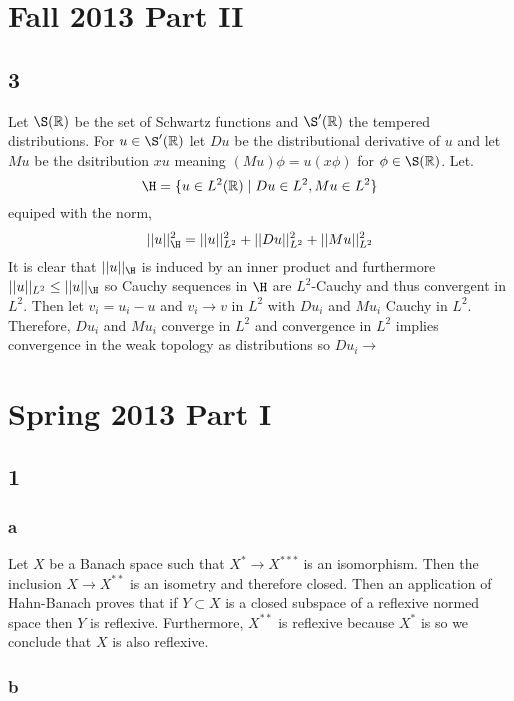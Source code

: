 \documentclass[12pt]{article}
\newcommand{\R}{\mathbb{R}}
\begin{document}
\section{Fall 2013 Part II}

\subsection{3}

Let $\S(\R)$ be the set of Schwartz functions and $\S'(\R)$ the tempered distributions. For $u \in \S'(\R)$ let $Du$ be the distributional derivative of $u$ and let $M u$ be the dsitribution $x u$ meaning $(M u) \phi = u(x \phi)$ for $\phi \in \S(\R)$. Let.
\[ \H = \{ u \in L^2(\R) \mid D u \in L^2, Mu \in L^2 \} \]
equiped with the norm,
\[ || u ||_{\H}^2 = || u ||_{L^2}^2 + || D u ||_{L^2}^2 + || M u ||^2_{L^2} \]
It is clear that $|| u ||_{\H}$ is induced by an inner product and furthermore $|| u ||_{L^2} \le || u ||_{\H}$ so Cauchy sequences in $\H$ are $L^2$-Cauchy and thus convergent in $L^2$. Then let $v_i = u_i - u$ and $v_i \to v$ in $L^2$ with $D u_i$ and $M u_i$ Cauchy in $L^2$. Therefore, $D u_i$ and $M u_i$ converge in $L^2$ and convergence in $L^2$ implies convergence in the weak topology as distributions so $D u_i \to $


\section{Spring 2013 Part I}

\subsection{1}

\subsubsection{a}

Let $X$ be a Banach space such that $X^* \to X^{***}$ is an isomorphism. Then the inclusion $X \to X^{**}$ is an isometry and therefore closed. Then an application of Hahn-Banach proves that if $Y \subset X$ is a closed subspace of a reflexive normed space then $Y$ is reflexive. Furthermore, $X^{**}$ is reflexive because $X^{*}$ is so we conclude that $X$ is also reflexive. 

\subsubsection{b}
\end{document}

